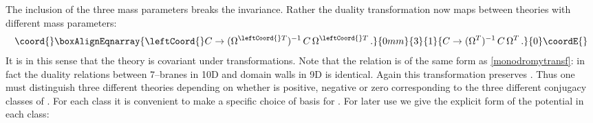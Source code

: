 \documentclass[12pt,a4paper]{article}
\def\bb#1{\hbox{\mybb#1}}
\begin{document}
The inclusion of the three mass parameters breaks the \myHighlight{$SL(2,\bb{R})$}\coordHE{}
invariance. Rather the duality transformation now maps between
theories with different mass parameters:
\begin{align}\coord{}\boxAlignEqnarray{
  \leftCoord{}C \rightarrow (\Omega^{\leftCoord{}T})^{-1} \, C \, \Omega^{\leftCoord{}T} \,.
}{0mm}{3}{1}{
  C \rightarrow (\Omega^{T})^{-1} \, C \, \Omega^{T} \,.
}{0}\coordE{}\end{align}
It is in this sense that the theory is covariant under \myHighlight{$SL(2,\bb{R})$}\coordHE{}
transformations.
Note that the relation is of the same form as \eqref{monodromytransf}:
in fact the duality relations between 7--branes in 10D
and domain walls in 9D is identical. Again this transformation
preserves \coordHE{}.
Thus one must distinguish three different theories depending on
whether \coordHE{} is positive, negative or zero corresponding
to the three different conjugacy classes of \myHighlight{$SL(2,\bb{R})$}\coordHE{} \cite{Hull:1998vy}.
For each class it is convenient to make
a specific choice of basis for \coordHE{}. For later use
we give the explicit form of the potential in each class:
\end{document}
